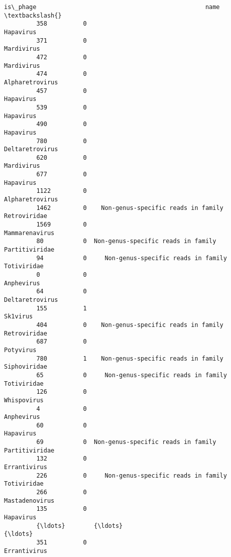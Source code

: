 \documentclass[11pt]{article}
\begin{document}
\begin{Verbatim}[commandchars=\\\{\}]
               is\_phage                                               name  \textbackslash{}
         358          0                                          Hapavirus   
         371          0                                         Mardivirus   
         472          0                                         Mardivirus   
         474          0                                    Alpharetrovirus   
         457          0                                          Hapavirus   
         539          0                                          Hapavirus   
         490          0                                          Hapavirus   
         780          0                                    Deltaretrovirus   
         620          0                                         Mardivirus   
         677          0                                          Hapavirus   
         1122         0                                    Alpharetrovirus   
         1462         0    Non-genus-specific reads in family Retroviridae   
         1569         0                                     Mammarenavirus   
         80           0  Non-genus-specific reads in family Partitiviridae   
         94           0     Non-genus-specific reads in family Totiviridae   
         0            0                                         Anphevirus   
         64           0                                    Deltaretrovirus   
         155          1                                           Sk1virus   
         404          0    Non-genus-specific reads in family Retroviridae   
         687          0                                          Potyvirus   
         780          1    Non-genus-specific reads in family Siphoviridae   
         65           0     Non-genus-specific reads in family Totiviridae   
         126          0                                        Whispovirus   
         4            0                                         Anphevirus   
         60           0                                          Hapavirus   
         69           0  Non-genus-specific reads in family Partitiviridae   
         132          0                                       Errantivirus   
         226          0     Non-genus-specific reads in family Totiviridae   
         266          0                                     Mastadenovirus   
         135          0                                          Hapavirus   
         {\ldots}        {\ldots}                                                {\ldots}   
         351          0                                       Errantivirus   

\end{Verbatim}
\end{document}
